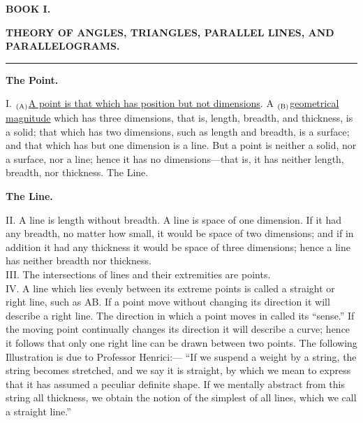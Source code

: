 \documentclass[12pt,a4paper,dvipdfmx]{jarticle}
\begin{document}
\begin{spacing}{1.5}
  \vspace{7mm}
  \begin{center}
    \LARGE
    \textbf{BOOK I.}
  \end{center}
  \begin{center}
    \textbf{THEORY OF ANGLES, TRIANGLES, PARALLEL LINES, AND PARALLELOGRAMS.}
  \end{center}
\begin{center}
  \rule{\textwidth}{0.4pt}
\end{center}

\begin{center}
  \textbf{The Point.}
\end{center}
\vspace{2mm}
I. $_{\rm(A)}$\ul{A point is that which has position but not dimensions}.
A $_{\rm(B)}$\ul{geometrical magnitude} which has three dimensions, that is, length, breadth, and thickness, is a solid; that which has two dimensions, such as length and breadth, is a surface; and
that which has but one dimension is a line. But a point is neither a solid, nor a surface, nor
a line; hence it has no dimensions—that is, it has neither length, breadth, nor thickness.
The Line. \\

\begin{center}
  \textbf{The Line.}
\end{center}
\vspace{2mm}
II. A line is length without breadth.
A line is space of one dimension. If it had any breadth, no matter how small, it would
be space of two dimensions; and if in addition it had any thickness it would be space of three
dimensions; hence a line has neither breadth nor thickness. \\

III. The intersections of lines and their extremities are points. \\

IV. A line which lies evenly between its extreme points is called a straight or right line, such as AB.
If a point move without changing its direction it will describe a right line. The direction in
which a point moves in called its “sense.” If the moving point continually changes its direction
it will describe a curve; hence it follows that only one right line can be drawn between two
points. The following Illustration is due to Professor Henrici:— “If we suspend a weight by a
string, the string becomes stretched, and we say it is straight, by which we mean to express
that it has assumed a peculiar definite shape. If we mentally abstract from this string all
thickness, we obtain the notion of the simplest of all lines, which we call a straight line.”


\end{spacing}
\end{document}
